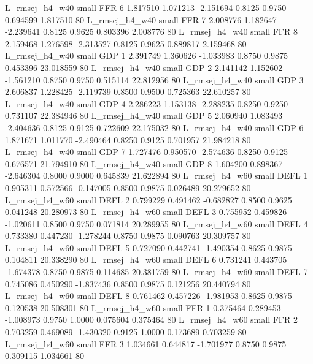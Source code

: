 L_rmsej_h4_w40      small      FFR                 6 1.817510 1.071213 -2.151694 0.8125 0.9750  0.694599    1.817510 80
L_rmsej_h4_w40      small      FFR                 7 2.008776 1.182647 -2.239641 0.8125 0.9625  0.803396    2.008776 80
L_rmsej_h4_w40      small      FFR                 8 2.159468 1.276598 -2.313527 0.8125 0.9625  0.889817    2.159468 80
L_rmsej_h4_w40      small      GDP                 1 2.391749 1.360626 -1.033983 0.8750 0.9875  0.453396   23.018559 80
L_rmsej_h4_w40      small      GDP                 2 2.141142 1.152602 -1.561210 0.8750 0.9750  0.515114   22.812956 80
L_rmsej_h4_w40      small      GDP                 3 2.606837 1.228425 -2.119739 0.8500 0.9500  0.725363   22.610257 80
L_rmsej_h4_w40      small      GDP                 4 2.286223 1.153138 -2.288235 0.8250 0.9250  0.731107   22.384946 80
L_rmsej_h4_w40      small      GDP                 5 2.060940 1.083493 -2.404636 0.8125 0.9125  0.722609   22.175032 80
L_rmsej_h4_w40      small      GDP                 6 1.871671 1.011770 -2.490464 0.8250 0.9125  0.701957   21.984218 80
L_rmsej_h4_w40      small      GDP                 7 1.727476 0.950570 -2.574636 0.8250 0.9125  0.676571   21.794910 80
L_rmsej_h4_w40      small      GDP                 8 1.604200 0.898367 -2.646304 0.8000 0.9000  0.645839   21.622894 80
L_rmsej_h4_w60      small     DEFL                 1 0.905311 0.572566 -0.147005 0.8500 0.9875  0.026489   20.279652 80
L_rmsej_h4_w60      small     DEFL                 2 0.799229 0.491462 -0.682827 0.8500 0.9625  0.041248   20.280973 80
L_rmsej_h4_w60      small     DEFL                 3 0.755952 0.459826 -1.020611 0.8500 0.9750  0.071814   20.289955 80
L_rmsej_h4_w60      small     DEFL                 4 0.733380 0.447230 -1.278244 0.8750 0.9875  0.090763   20.309757 80
L_rmsej_h4_w60      small     DEFL                 5 0.727090 0.442741 -1.490354 0.8625 0.9875  0.104811   20.338290 80
L_rmsej_h4_w60      small     DEFL                 6 0.731241 0.443705 -1.674378 0.8750 0.9875  0.114685   20.381759 80
L_rmsej_h4_w60      small     DEFL                 7 0.745086 0.450290 -1.837436 0.8500 0.9875  0.121256   20.440794 80
L_rmsej_h4_w60      small     DEFL                 8 0.761462 0.457226 -1.981953 0.8625 0.9875  0.120538   20.508301 80
L_rmsej_h4_w60      small      FFR                 1 0.375464 0.289453 -1.008973 0.9750 1.0000  0.075604    0.375464 80
L_rmsej_h4_w60      small      FFR                 2 0.703259 0.469089 -1.430320 0.9125 1.0000  0.173689    0.703259 80
L_rmsej_h4_w60      small      FFR                 3 1.034661 0.644817 -1.701977 0.8750 0.9875  0.309115    1.034661 80
